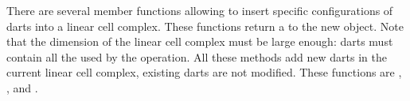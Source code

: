 There are several member functions allowing to insert specific
configurations of darts into a linear cell complex. These functions
return a  to the new object.  Note
that the dimension of the linear cell complex must be large enough:
darts must contain all the \betats{} used by the operation.  All these
methods add new darts in the current linear cell complex, existing
darts are not modified. These functions
are , , %
 and . %


